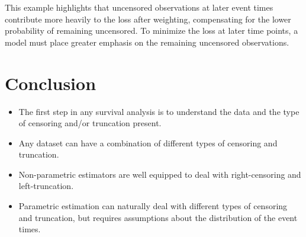 \documentclass[
  letterpaper,
  krantz2]{style/krantz}
\providecommand{\tightlist}{%
  \setlength{\itemsep}{0pt}\setlength{\parskip}{0pt}}
\begin{document}
This example highlights that uncensored observations at later event
times contribute more heavily to the loss after weighting, compensating
for the lower probability of remaining uncensored. To minimize the loss
at later time points, a model must place greater emphasis on the
remaining uncensored observations.

\section{Conclusion}\label{conclusion-1}

\begin{tcolorbox}[enhanced jigsaw, toprule=.15mm, bottomtitle=1mm, opacityback=0, breakable, leftrule=.75mm, title={Key takeaways}, toptitle=1mm, bottomrule=.15mm, colback=white, colframe=quarto-callout-warning-color-frame, titlerule=0mm, opacitybacktitle=0.6, coltitle=black, rightrule=.15mm, left=2mm, colbacktitle=quarto-callout-warning-color!10!white, arc=.35mm]

\begin{itemize}
\tightlist
\item
  The first step in any survival analysis is to understand the data and
  the type of censoring and/or truncation present.
\item
  Any dataset can have a combination of different types of censoring and
  truncation.
\item
  Non-parametric estimators are well equipped to deal with
  right-censoring and left-truncation.
\item
  Parametric estimation can naturally deal with different types of
  censoring and truncation, but requires assumptions about the
  distribution of the event times.
\end{itemize}

\end{tcolorbox}
\end{document}
